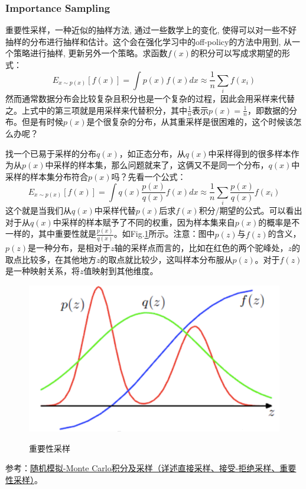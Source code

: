 \subsubsection{Importance Sampling}
重要性采样，一种近似的抽样方法, 通过一些数学上的变化, 使得可以对一些不好抽样的分布进行抽样和估计。这个会在强化学习中的off-policy的方法中用到, 从一个策略进行抽样, 更新另外一个策略。求函数$f(x)$的积分可以写成求期望的形式：
$$
E_{x \sim p(x)}[f(x)] = \int p(x) f(x) d x \approx \frac{1}{n} \sum_{i} f(x_{i})
$$
然而通常数据分布会比较复杂且积分也是一个复杂的过程，因此会用采样来代替之。上式中的第三项就是用采样来代替积分，其中$\frac{1}{n}$表示$p(x) = \frac{1}{n}$，即数据的分布。但是有时候$p(x)$是个很复杂的分布，从其重采样是很困难的，这个时候该怎么办呢？

找一个已易于采样的分布$q(x)$，如正态分布，从$q(x)$中采样得到的很多样本作为从$p(x)$中采样的样本集，那么问题就来了，这俩又不是同一个分布，$q(x)$中采样的样本集分布符合$p(x)$吗？先看一个公式：
$$
E_{x \sim p(x)}[f(x)] = \int q(x) \frac{p(x)}{q(x)} f(x) d x \approx \frac{1}{n} \sum_{i}  \frac{p(x)}{q(x)} f(x_{i})
$$
这个就是当我们从$q(x)$中采样代替$p(x)$后求$f(x)$积分/期望的公式。可以看出对于从$q(x)$中采样的样本赋予了不同的权重，因为样本集来自$p(x)$的概率是不一样的，其中重要性就是$\frac{p(x)}{q(x)}$。如Fig.\ref{fig:importance-sample}所示。注意：图中$p(z)$与$f(z)$的含义，$p(z)$是一种分布，是相对于$z$轴的采样点而言的，比如在红色的两个驼峰处，$z$的取点比较多，在其他地方$z$的取点就比较少，这叫样本分布服从$p(z)$。对于$f(z)$是一种映射关系，将$z$值映射到其他维度。

\begin{figure}[h]
	\centering
	\includegraphics[width=.5\textwidth]{pics/importance-sample.png}
	\label{fig:importance-sample}
	\caption{重要性采样}
\end{figure}

参考：\href{https://www.jianshu.com/p/3d30070932a8}{随机模拟-Monte Carlo积分及采样（详述直接采样、接受-拒绝采样、重要性采样）}。


